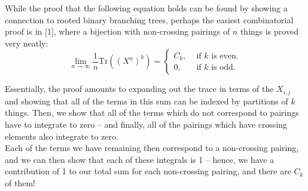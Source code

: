  \vspace{0.2cm}

While the proof that the following equation holds can be found by showing a connection to rooted binary branching trees, perhaps the easiest combinatorial proof is in [1], where a bijection with non-crossing pairings of $n$ things is proved very neatly: 
\[
\lim_{n \to \infty} \frac{1}{n} \text{Tr} \left((X^n)^k \right) = 
\begin{cases}
C_k, & \text{ if }k \text{ is even.} \\
0, & \text{ if }k \text{ is odd.} 
\end{cases}
\]

Essentially, the proof amounts to expanding out the trace in terms of the $X_{i,j}$ and showing that all of the terms in this sum can be indexed by partitions of $k$ things. Then, we show that all of the terms which do not correspond to pairings have to integrate to zero -- and finally, all of the pairings which have crossing elements also integrate to zero. \\

Each of the terms we have remaining then correspond to a non-crossing pairing, and we can then show that each of these integrals is 1 -- hence, we have a contribution of 1 to our total sum for each non-crossing pairing, and there are $C_k$ of them! \\

